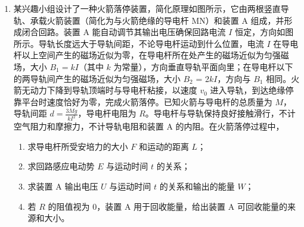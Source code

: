 \documentclass[\gkver]{gaokaozhenti}
\begin{document}
\begin{enumerate}
{ $\frac{1}{2}mv_{1}^{2}=\frac{1}{2}mv_{C}^{2}+mg\cdot2R$

解得  $v_{1}=5\ \Ums$

因 ab 碰撞动量守恒，则

 $mv_{F}=-mv_{1}+3mv_{2}$

解得碰后 b 的速度  $v_{2}=5\ \Ums$

则碰撞损失的能量

$$ \Delta E=\frac{1}{2}mv_{F}^{2}-\frac{1}{2}mv_{1}^{2}-\frac{1}{2}\cdot3mv_{2}^{2}=0 $$

（3）若滑块 a 碰到滑块 b 立即被粘住，则 ab 碰后的共同速度  $m v_{F} = 4m v$

解得  $v = 2.5 \, \Ums$

当弹簧被压缩到最短或者伸长到最长时有共同速度

 $4mv = 6mv'$

则  $v' = \frac{5}{3} \Ums$

当弹簧被压缩到最短时压缩量为  $x_{1}$，由能量关系

 $\frac{1}{2} \cdot 4mv^{2} = \frac{1}{2} \cdot 6mv'^{2} + \frac{1}{2} kx_{1}^{2}$

解得  $x_{1} = 0.1\Um$

同理当弹簧被拉到最长时伸长量为  $x_{2} = x_{1}$

则弹簧最大长度与最小长度之差  $\Delta x = 2x_{1} = 0.2\Um$
}

\item
某兴趣小组设计了一种火箭落停装置，简化原理如图所示，它由两根竖直导轨、承载火箭装置（简化为与火箭绝缘的导电杆 MN）和装置 A 组成，并形成闭合回路。装置 A 能自动调节其输出电压确保回路电流 $I$ 恒定，方向如图所示。导轨长度远大于导轨间距，不论导电杆运动到什么位置，电流 $I$ 在导电杆以上空间产生的磁场近似为零，在导电杆所在处产生的磁场近似为匀强磁场，大小 $B_{1} = kI$（其中 $k$ 为常量），方向垂直导轨平面向里；在导电杆以下的两导轨间产生的磁场近似为匀强磁场，大小 $B_{2}$ = 2$kI$，方向与 $B_{1}$ 相同。火箭无动力下降到导轨顶端时与导电杆粘接，以速度 $v_{0}$ 进入导轨，到达绝缘停靠平台时速度恰好为零，完成火箭落停。已知火箭与导电杆的总质量为 $M$，导轨间距 $d = \frac{{3Mg}}{{k{I^2}}}$，导电杆电阻为 $R$。导电杆与导轨保持良好接触滑行，不计空气阻力和摩擦力，不计导轨电阻和装置 A 的内阻。在火箭落停过程中，
\begin{enumerate}
	\item
	求导电杆所受安培力的大小 $F$ 和运动的距离 $L$；
	\item
	求回路感应电动势 $E$ 与运动时间 $t$ 的关系；
	\item
	求装置 A 输出电压 $U$ 与运动时间 $t$ 的关系和输出的能量 $W$；
	\item
	若 $R$ 的阻值视为 0，装置 A 用于回收能量，给出装置 A 可回收能量的来源和大小。
\end{enumerate}
\end{enumerate}
\end{document}
